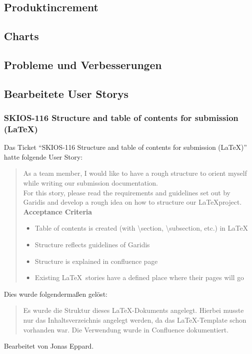 \subsection{Produktincrement}
\subsection{Charts}
\subsection{Probleme und Verbesserungen}

\subsection{Bearbeitete User Storys}

\subsubsection{SKIOS-116 Structure and table of contents for submission (\LaTeX)}
Das Ticket \enquote{SKIOS-116 Structure and table of contents for submission (\LaTeX)}
hatte folgende User Story:
\begin{quotation}
    As a team member, I would like to have a rough structure to orient myself while writing our submission documentation.\\
    For this story, please read the requirements and guidelines set out by Garidis and develop a rough idea on how to structure our \LaTeX project.\\
    \textbf{Acceptance Criteria}
    \begin{itemize}
        \item Table of contents is created (with \textbackslash{}section, \textbackslash{}subsection, etc.) in \LaTeX
        \item Structure reflects guidelines of Garidis
        \item Structure is explained in confluence page
        \item Existing \LaTeX~stories have a defined place where their pages will go
    \end{itemize}
\end{quotation}
Dies wurde folgendermaßen gelöst:
\begin{quotation}
    Es wurde die Struktur dieses \LaTeX-Dokuments angelegt. Hierbei musste nur das Inhaltsverzeichnis
    angelegt werden, da das \LaTeX-Template schon vorhanden war.
    Die Verwendung wurde in Confluence dokumentiert.
\end{quotation}
Bearbeitet von Jonas Eppard.

